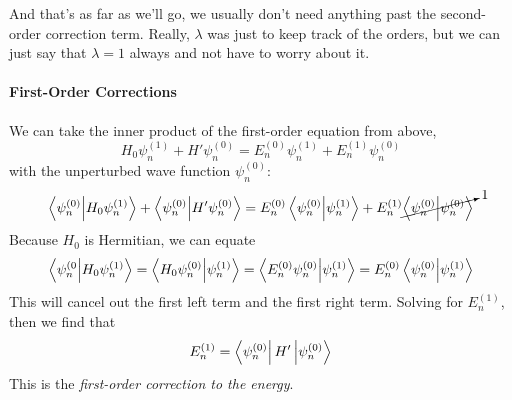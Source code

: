 \documentclass[a4paper]{article}
\begin{document}
And that's as far as we'll go, we usually don't need anything past the
second-order correction term. Really, $\lambda$ was just to keep track of the
orders, but we can just say that $\lambda=1$ always and not have to worry about
it.

\paragraph{First-Order Corrections}
We can take the inner product of the first-order equation from above,
\[ H_0\psi_n^{(1)} + H'\psi_n^{(0)} =
	E_n^{(0)}\psi_n^{(1)} + E_n^{(1)}\psi_n^{(0)} \]
with the unperturbed wave function $\psi_n^{(0)}$:
\begin{align*}
	\left\langle \psi_n^{(0)}\middle\vert H_0\psi_n^{(1)} \right\rangle +
	\left\langle \psi_n^{(0)}\middle\vert H'\psi_n^{(0)} \right\rangle &=
		E_n^{(0)} \left\langle \psi_n^{(0)}\middle\vert \psi_n^{(1)} \right\rangle +
		E_n^{(1)} \cancelto{1}{\left\langle \psi_n^{(0)}\middle\vert \psi_n^{(0)} \right\rangle}\\
\end{align*}
Because $H_0$ is Hermitian, we can equate
\[ \left\langle \psi_n^{(0}\middle\vert H_0\psi_n^{(1)} \right\rangle =
	\left\langle H_0\psi_n^{(0)}\middle\vert \psi_n^{(1)} \right\rangle =
	\left\langle E_n^{(0)}\psi_n^{(0)}\middle\vert \psi_n^{(1)} \right\rangle =
	E_n^{(0)} \left\langle \psi_n^{(0)}\middle\vert \psi_n^{(1)} \right\rangle
\]
This will cancel out the first left term and the first right term.
Solving for $E_n^{(1)}$, then we find that
\[ E_n^{(1)} = \left\langle \psi_n^{(0)} \right\rvert H'\left\lvert \psi_n^{(0)}\right\rangle \]
This is the \emph{first-order correction to the energy}.
\end{document}
